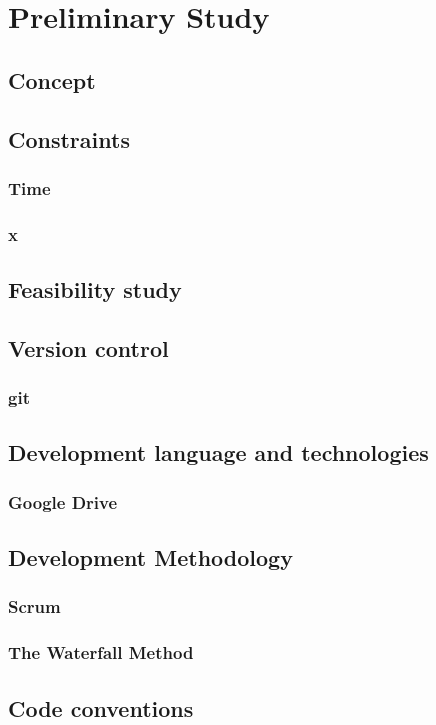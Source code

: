 \documentclass[10pt,a4paper,oneside]{report}
\begin{document}
\chapter{Preliminary Study}
\section{Concept}
\section{Constraints}
\subsection{Time}
\subsection{x}
\section{Feasibility study}
\section{Version control}
\subsection{git}
\section{Development language and technologies}
\subsection{Google Drive}
\section{Development Methodology}
\subsection{Scrum}
\subsection{The Waterfall Method}


\clearpage

\section{Code conventions}
\end{document}
